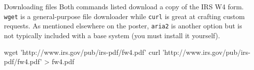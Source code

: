 \begin{block}{Downloading files}
  Both commands listed download a copy of the IRS W4 form. \texttt{wget} is a general-purpose file downloader while \texttt{curl} is great at crafting custom requests. As mentioned elsewhere on the poster, \texttt{aria2} is another option but is not typically included with a base system (you must install it yourself).
  \begin{indented}
    \begin{bashcode}
      wget 'http://www.irs.gov/pub/irs-pdf/fw4.pdf'
      curl 'http://www.irs.gov/pub/irs-pdf/fw4.pdf' > fw4.pdf
    \end{bashcode}
  \end{indented}
\end{block}
